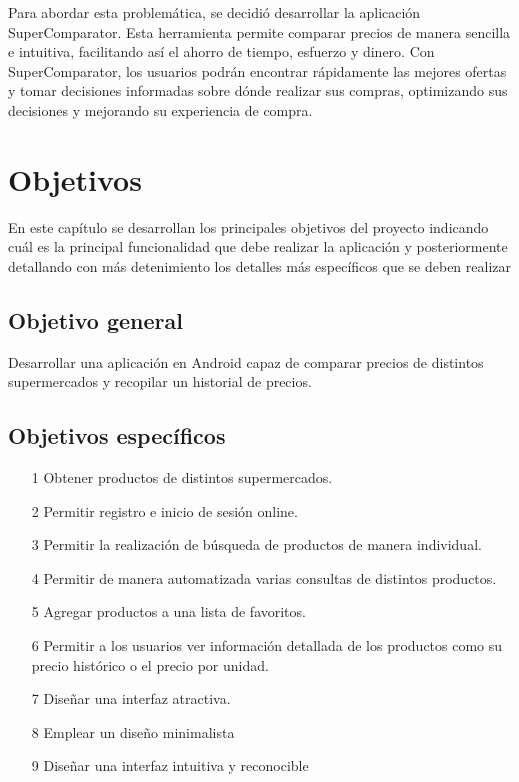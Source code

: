 \documentclass[12pt,twoside,titlepage]{report}
\begin{document}
Para abordar esta problemática, se decidió desarrollar la aplicación SuperComparator. Esta herramienta permite comparar precios de manera sencilla e intuitiva, facilitando así el ahorro de tiempo, esfuerzo y dinero. Con SuperComparator, los usuarios podrán encontrar rápidamente las mejores ofertas y tomar decisiones informadas sobre dónde realizar sus compras, optimizando sus decisiones y mejorando su experiencia de compra.

\chapter{Objetivos}

En este capítulo se desarrollan los principales objetivos del proyecto indicando cuál es la principal funcionalidad que debe realizar la aplicación y posteriormente detallando con más detenimiento los detalles más específicos que se deben realizar




\section{Objetivo general}

Desarrollar una aplicación en Android capaz de comparar precios de distintos supermercados y recopilar un historial de precios.

\section{Objetivos específicos}

\begin{itemize}

	\item[1] Obtener productos de distintos supermercados.
 
	\item[2] Permitir registro e inicio de sesión online.
 
    \item[3] Permitir la realización de búsqueda de productos de manera individual.
	
    \item[4] Permitir de manera automatizada varias consultas de distintos productos.
	
    \item[5] Agregar productos a una lista de favoritos.
	
    \item[6] Permitir a los usuarios ver información detallada de los productos como su precio histórico o el precio por unidad.

    \item[7] Diseñar una interfaz atractiva.

    \item[8] Emplear un diseño minimalista 

    \item[9] Diseñar una interfaz intuitiva y reconocible
    
\end{itemize}
\end{document}
